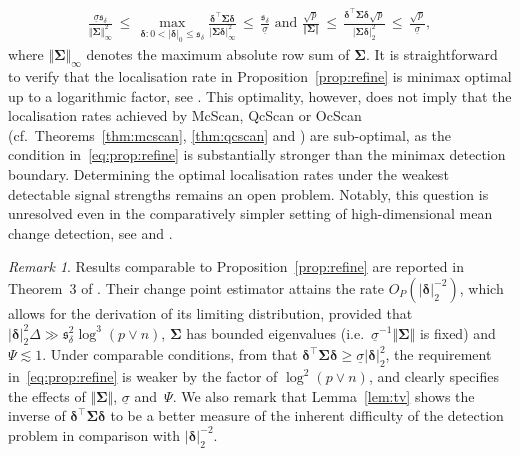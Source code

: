 \documentclass[11pt, a4paper]{article}
\theoremstyle{definition}
\theoremstyle{definition}
\theoremstyle{definition}
\theoremstyle{definition}
\theoremstyle{definition}
\theoremstyle{remark}
\newtheorem{rem}{Remark}[section]
\theoremstyle{definition}
\theoremstyle{definition}
\theoremstyle{definition}
\begin{document}
\begin{align*}
\frac{\underline{\sigma}\mathfrak{s}_\delta}{\Vert \bm\Sigma \Vert_\infty^2} \,\le\, \max_{\bm\delta: 0 <  \vert\bm\delta\vert_0 \le \mathfrak{s}_\delta} \frac{\bm\delta^\top\bm\Sigma\bm\delta}{\vert \bm\Sigma \bm\delta \vert_\infty^2} \,\le\, \frac{\mathfrak{s}_\delta}{\underline{\sigma}} \text{ \ and \ }
\frac{\sqrt{p}}{\Vert \bm\Sigma \Vert}\, \le\, \frac{\bm\delta^\top\bm\Sigma\bm\delta \sqrt{p}}{\vert \bm\Sigma \bm\delta \vert_2^2}\, \le\, \frac{\sqrt{p}}{\underline{\sigma}},
\end{align*}
where $\Vert\bm\Sigma\Vert_\infty$ denotes the maximum absolute row sum of $\bm\Sigma$.  
It is straightforward to verify that the localisation rate in Proposition~\ref{prop:refine} is minimax optimal up to a logarithmic factor, see . This optimality, however, does not imply that the localisation rates achieved by McScan, QcScan or OcScan (cf.\ Theorems~\ref{thm:mcscan}, \ref{thm:qcscan} and ) are sub-optimal, as the condition in~\eqref{eq:prop:refine} is substantially stronger than the minimax detection boundary. Determining the optimal localisation rates under the weakest detectable signal strengths remains an open problem. Notably, this question is unresolved even in the comparatively simpler setting of high-dimensional mean change detection, see \citet[Section~7.2]{pilliat2023optimal} and \citet[Section~7]{kovacs2024optimistic}.

\begin{rem}
Results comparable to Proposition~\ref{prop:refine} are reported in Theorem~3 of \cite{xu2024change}.
Their change point estimator attains the rate $O_P(\vert \bm\delta \vert_2^{-2})$, which allows for the derivation of its limiting distribution, %
provided that $\vert \bm\delta \vert_2^2 \Delta \gg \mathfrak{s}_\delta^2 \log^3(p \vee n)$, $\bm\Sigma$ has bounded eigenvalues (i.e.\ $\underline{\sigma}^{-1} \Vert \bm\Sigma \Vert$ is fixed) and $\Psi \lesssim 1$.
Under comparable conditions, from that $\bm\delta^\top \bm\Sigma \bm\delta \ge \underline{\sigma} \vert \bm\delta \vert_2^2$, the requirement in~\eqref{eq:prop:refine} is weaker by the factor of $\log^2(p \vee n)$, and clearly specifies the effects of $\Vert \bm\Sigma \Vert$, $\underline{\sigma}$ and~$\Psi$.
We also remark that Lemma~\ref{lem:tv} shows the inverse of $\bm\delta^\top \bm\Sigma \bm\delta$ to be a better measure of the inherent difficulty of the detection problem in comparison with $\vert \bm\delta \vert_2^{-2}$. 
\end{rem}
\end{document}
